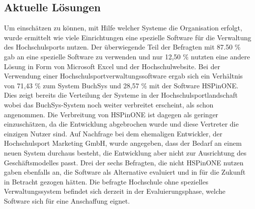 \subsection{Aktuelle Lösungen}
Um einschätzen zu können, mit Hilfe welcher Systeme die Organisation erfolgt, wurde ermittelt wie viele Einrichtungen eine spezielle Software für die Verwaltung des Hochschulsports nutzen. Der überwiegende Teil der Befragten mit 87.50 \% gab an eine spezielle Software zu verwenden und nur 12,50 \% nutzten eine andere Lösung in Form von Microsoft Excel und der Hochschulwebsite. Bei der Verwendung einer Hochschulsportverwaltungssoftware ergab sich ein Verhältnis von 71,43 \% zum System BuchSys und 28,57 \% mit der Software HSPinONE. Dies zeigt bereits die Verteilung der Systeme in der Hochschulsportlandschaft wobei das BuchSys-System noch weiter verbreitet erscheint, als schon angenommen. Die Verbreitung von HSPinONE ist dagegen als geringer einzuschätzen, da die Entwicklung abgebrochen wurde und diese Vertreter die einzigen Nutzer sind. Auf Nachfrage bei dem ehemaligen Entwickler, der Hochschulsport Marketing GmbH, wurde angegeben, dass der Bedarf an einem neuen System durchaus besteht, die Entwicklung aber nicht zur Ausrichtung des Geschäftsmodelles passt. Drei der sechs Befragten, die nicht HSPinONE nutzen gaben ebenfalls an, die Software als Alternative evaluiert und in für die Zukunft in Betracht gezogen hätten. Die befragte Hochschule ohne spezielles Verwaltungssystem befindet sich derzeit in der Evaluierungsphase, welche Software sich für eine Anschaffung eignet.
\\

